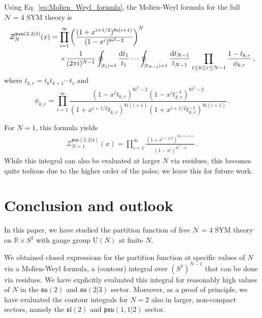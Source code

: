 \documentclass[a4paper,11pt]{article}
\DeclareMathOperator{\phaneq}{\phantom{{}=}}
\begin{document}
Using Eq.\ \eqref{eq:Molien_Weyl_formula}, the Molien-Weyl formula for the full $\mathcal{N}=4$ SYM theory is
%
\begin{equation}\label{eq:Molien_Weyl_psu224_v0}
\begin{split}
	\mathcal{Z}_N^{\mathfrak{psu}(2,2|4)}(x) & =\prod_{i=1}^\infty\qty(\frac{(1+x^{i+1/2})^{8i(i+1)}}{(1-x^{i})^{8i^2-2}})^{N}\\
	 &\phaneq\times\frac{1}{(2\pi i)^{N-1}}\oint_{|t_1|=1} \frac{\dd t_1}{t_1} \cdots \oint_{|t_{N-1}|=1} \frac{\dd t_{N-1}}{t_{N-1}}  \prod_{1\leq k\leq r\leq N-1} \frac{1-t_{k,r}}{\phi_{k,r}} \,,
\end{split}
\end{equation}
%
where $t_{k,r}=t_k t_{k+1}\cdots t_r$ and
%
\begin{equation}
	\phi_{k,r} = \prod_{i=1}^\infty\frac{(1-x^it_{k,r})^{8i^2-2}(1-x^it^{-1}_{k,r})^{8i^2-2}}{(1+x^{i+1/2}t_{k,r})^{8i(i+1)}(1+x^{i+1/2}t^{-1}_{k,r})^{8i(i+1)}}\,.  
\end{equation}

For $N=1$, this formula yields
%
\begin{equation}\label{eq:Z_psu224_N=1}
\begin{split}
	\mathcal{Z}_{N=1}^{\mathfrak{psu}(2,2|4)}(x) = \prod_{i=1}^\infty\frac{(1+x^{i+1/2})^{8i(i+1)}}{(1-x^{i})^{8i^2-2}}\,.
\end{split}
\end{equation}
%
%
While this integral can also be evaluated at larger $N$ via residues, this becomes quite tedious due to the higher order of the poles; we leave this for future work.

\section{Conclusion and outlook}
\label{sec: conclusion}

In this paper, we have studied the partition function of free $\mathcal{N}=4$ SYM theory on $\mathbb{R}\times S^3$ with gauge group $\text{U}(N)$ at finite $N$.

We obtained closed expressions for the partition function at specific values of $N$ via a Molien-Weyl formula,
 a (contour) integral over $(S^1)^{N-1}$ that can be done via residues.
We have explicitly evaluated this integral for reasonably high values of $N$ 
 in the $\mathfrak{su}(2)$ and $\mathfrak{su}(2|3)$ sector.
Moreover, as a proof of principle, we have evaluated the contour integrals for $N=2$ also in larger, non-compact sectors, namely the $\mathfrak{sl}(2)$ and $\mathfrak{psu}(1,1|2)$ sector.
\end{document}
